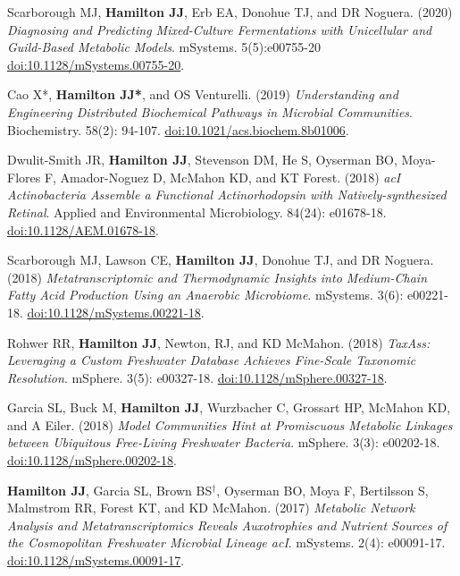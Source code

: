 \documentclass[letterpaper,11pt]{article}
\newlength{\outerbordwidth}
\newcommand{\resheading}[1]{\vspace{8pt}
  \parbox{\textwidth}{
  \setlength{\FrameSep}{\outerbordwidth}
\setlength{\fboxsep}{0pt}
\framebox[\textwidth][l]{\setlength{\fboxsep}{4pt}\fcolorbox{shadecolorB}{shadecolorB}{\textbf{\sffamily{\mbox{~}\makebox[6.262in][l]{\large #1} \vphantom{p\^{E}}}}}}
  }
  \vspace{-5pt}
}
\begin{document}

\resheading{Publications}
\begin{etaremune}[itemsep=-2pt]
	\item Scarborough MJ, \textbf{Hamilton JJ}, Erb EA, Donohue TJ, and DR Noguera. (2020) \emph{Diagnosing and Predicting Mixed-Culture Fermentations with Unicellular and Guild-Based Metabolic Models}. mSystems. 5(5):e00755-20 \href{https://doi.org/10.1128/mSystems.00755-20}{doi:10.1128/mSystems.00755-20}.
	\item Cao X*, \textbf{Hamilton JJ*}, and OS Venturelli. (2019) \emph{Understanding and Engineering Distributed Biochemical Pathways in Microbial Communities}. Biochemistry. 58(2): 94-107. \href{https://doi.org/10.1021/acs.biochem.8b01006}{doi:10.1021/acs.biochem.8b01006}.
	\item Dwulit-Smith JR, \textbf{Hamilton JJ}, Stevenson DM, He S, Oyserman BO, Moya-Flores F, Amador-Noguez D, McMahon KD, and KT Forest. (2018) \emph{acI Actinobacteria Assemble a Functional Actinorhodopsin with Natively-synthesized Retinal}. Applied and Environmental Microbiology. 84(24): e01678-18. \href{https://doi.org/10.1128/AEM.01678-18}{doi:10.1128/AEM.01678-18}.
	\item Scarborough MJ, Lawson CE, \textbf{Hamilton JJ}, Donohue TJ, and DR Noguera. (2018) \emph{Metatranscriptomic and Thermodynamic Insights into Medium-Chain Fatty Acid Production Using an Anaerobic Microbiome}. mSystems. 3(6): e00221-18. \href{https://doi.org/10.1128/mSystems.00221-18}{doi:10.1128/mSystems.00221-18}.
	\item Rohwer RR, \textbf{Hamilton JJ}, Newton, RJ, and KD McMahon. (2018) \emph{TaxAss: Leveraging a Custom Freshwater Database Achieves Fine-Scale Taxonomic Resolution}. mSphere. 3(5): e00327-18. \href{https://doi.org/10.1128/mSphere.00327-18}{doi:10.1128/mSphere.00327-18}.
	\item Garcia SL, Buck M, \textbf{Hamilton JJ}, Wurzbacher C, Grossart HP, McMahon KD, and A Eiler. (2018) \emph{Model Communities Hint at Promiscuous Metabolic Linkages between Ubiquitous Free-Living Freshwater Bacteria}. mSphere. 3(3): e00202-18. \href{https://doi.org/10.1128/mSphere.00202-18}{doi:10.1128/mSphere.00202-18}.
	\item \textbf{Hamilton JJ}, Garcia SL, Brown BS$^\dagger$, Oyserman BO, Moya F, Bertilsson S, Malmstrom RR, Forest KT, and KD McMahon. (2017) \emph{Metabolic Network Analysis and Metatranscriptomics Reveals Auxotrophies and Nutrient Sources of the Cosmopolitan Freshwater Microbial Lineage acI}. mSystems. 2(4): e00091-17. \href{https://doi.org/10.1128/mSystems.00091-17}{doi:10.1128/mSystems.00091-17}.

\end{etaremune}
\end{document}
